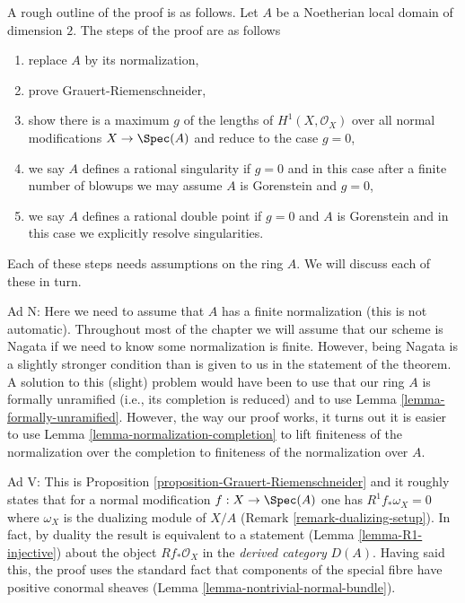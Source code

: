 \medskip\noindent
A rough outline of the proof is as follows. Let $A$ be a
Noetherian local domain of dimension $2$. The steps of the proof
are as follows
\begin{enumerate}
\item[N] replace $A$ by its normalization,
\item[V] prove Grauert-Riemenschneider,
\item[B] show there is a maximum $g$ of the lengths of
$H^1(X, \mathcal{O}_X)$ over all normal modifications $X \to \Spec(A)$
and reduce to the case $g = 0$,
\item[R] we say $A$ defines a rational singularity if $g = 0$
and in this case after a finite number of
blowups we may assume $A$ is Gorenstein and $g = 0$,
\item[D] we say $A$ defines a rational double point if
$g = 0$ and $A$ is Gorenstein and in this case we
explicitly resolve singularities.
\end{enumerate}
Each of these steps needs assumptions on the ring $A$.
We will discuss each of these in turn.

\medskip\noindent
Ad N: Here we need to assume that $A$ has a finite normalization
(this is not automatic). Throughout most of the chapter we will
assume that our scheme is Nagata if we need to know some normalization
is finite. However, being Nagata is a slightly stronger condition
than is given to us in the statement of the theorem.
A solution to this (slight) problem would have been to use that
our ring $A$ is formally unramified (i.e., its completion
is reduced) and to use Lemma \ref{lemma-formally-unramified}.
However, the way our proof works, it turns out it is easier to
use Lemma \ref{lemma-normalization-completion}
to lift finiteness of the normalization over the
completion to finiteness of the normalization over $A$.

\medskip\noindent
Ad V: This is Proposition \ref{proposition-Grauert-Riemenschneider}
and it roughly states that for a normal modification $f : X \to \Spec(A)$
one has $R^1f_*\omega_X = 0$ where $\omega_X$ is the dualizing module
of $X/A$ (Remark \ref{remark-dualizing-setup}).
In fact, by duality the result is equivalent to a statement
(Lemma \ref{lemma-R1-injective})
about the object $Rf_*\mathcal{O}_X$ in the {\it derived category} $D(A)$.
Having said this, the proof uses the standard fact that
components of the special fibre have positive conormal
sheaves (Lemma \ref{lemma-nontrivial-normal-bundle}).


